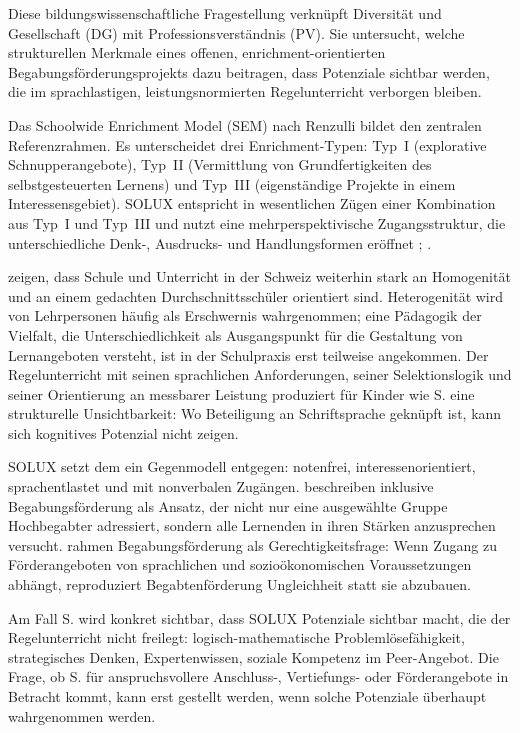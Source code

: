 \documentclass[ngerman, a4paper]{article}
\begin{document}
Diese bildungswissenschaftliche Fragestellung verknüpft Diversität und Gesellschaft (DG)
mit Professionsverständnis (PV). Sie untersucht, welche strukturellen Merkmale eines
offenen, enrichment-orientierten Begabungsförderungsprojekts dazu beitragen, dass
Potenziale sichtbar werden, die im sprachlastigen, leistungsnormierten Regelunterricht
verborgen bleiben.

Das Schoolwide Enrichment Model (SEM) nach Renzulli bildet den zentralen
Referenzrahmen. Es unterscheidet drei Enrichment-Typen: Typ~I (explorative
Schnupperangebote), Typ~II (Vermittlung von Grundfertigkeiten des selbstgesteuerten
Lernens) und Typ~III (eigenständige Projekte in einem Interessensgebiet). SOLUX
entspricht in wesentlichen Zügen einer Kombination aus Typ~I und Typ~III und nutzt
eine mehrperspektivische Zugangsstruktur, die unterschiedliche Denk-, Ausdrucks- und
Handlungsformen eröffnet
\parencite[S.\,333--347]{reisrenzullimueller2021sem};
\parencite[S.\,94--99]{hoyer2013begabung}.

\textcite[S.\,8]{buholzerkummerwyss2010heterogenitaet} zeigen, dass Schule und Unterricht in der Schweiz weiterhin
stark an Homogenität und an einem gedachten Durchschnittsschüler orientiert sind.
Heterogenität wird von Lehrpersonen häufig als Erschwernis wahrgenommen; eine
Pädagogik der Vielfalt, die Unterschiedlichkeit als Ausgangspunkt für die Gestaltung
von Lernangeboten versteht, ist in der Schulpraxis erst teilweise angekommen.
Der Regelunterricht mit seinen sprachlichen
Anforderungen, seiner Selektionslogik und seiner Orientierung an messbarer Leistung
produziert für Kinder wie S. eine strukturelle Unsichtbarkeit: Wo Beteiligung an Schriftsprache
geknüpft ist, kann sich kognitives Potenzial nicht zeigen.

SOLUX setzt dem ein Gegenmodell entgegen: notenfrei, interessenorientiert,
sprachentlastet und mit nonverbalen Zugängen. \textcite[S.\,290--298]{weigand2021separativ} beschreiben inklusive
Begabungsförderung als Ansatz, der nicht nur eine ausgewählte Gruppe Hochbegabter
adressiert, sondern alle Lernenden in ihren Stärken anzusprechen versucht.
\textcite[S.\,65--76]{sedmak2021bildungsgerechtigkeit} rahmen Begabungsförderung als
Gerechtigkeitsfrage: Wenn Zugang zu Förderangeboten von sprachlichen und
sozioökonomischen Voraussetzungen abhängt, reproduziert Begabtenförderung
Ungleichheit statt sie abzubauen.

Am Fall S. wird konkret sichtbar, dass SOLUX Potenziale sichtbar macht, die der
Regelunterricht nicht freilegt: logisch-mathematische Problemlösefähigkeit, strategisches Denken,
Expertenwissen, soziale Kompetenz im Peer-Angebot. Die Frage, ob S. für
anspruchsvollere Anschluss-, Vertiefungs- oder Förderangebote in Betracht kommt,
kann erst gestellt werden, wenn solche Potenziale überhaupt wahrgenommen werden.
\end{document}
